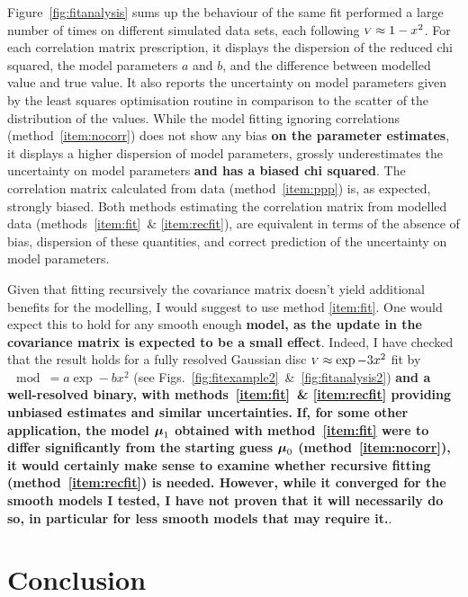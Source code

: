 \documentclass{pasa}
\def\correction#1{{\bfseries #1}}
\begin{document}
Figure~\ref{fig:fitanalysis} sums up the behaviour of the same fit performed a large number of times on different simulated data sets, each following ${\scriptstyle V} \approx 1-x^2$.  For each correlation matrix prescription, it displays the dispersion of the reduced chi squared, the model parameters $a$ and $b$, and the difference between modelled value and true value. It also reports the uncertainty on model parameters given by the least squares optimisation routine in comparison to the scatter of the distribution of the values. While the model fitting ignoring correlations (method~\ref{item:nocorr}) does not show any bias \correction{on the parameter estimates}, it displays a higher dispersion of model parameters,  grossly underestimates the uncertainty on model parameters \correction{and has a biased chi squared}.  The correlation matrix calculated from data (method~\ref{item:ppp}) is, as expected, strongly biased. Both methods estimating the correlation  matrix from modelled data (methods~\ref{item:fit}~\& \ref{item:recfit}), are equivalent in terms of the absence of bias, dispersion of these quantities, and correct prediction of the uncertainty on model parameters.

Given that fitting recursively the covariance matrix doesn't yield additional benefits for the modelling, I would suggest to use method \ref{item:fit}. One would expect this to hold for any smooth enough \textbf{model, as the update in the covariance matrix is expected to be a small effect}. Indeed, I have checked that the result holds for a fully resolved Gaussian disc ${\scriptstyle V} \approx \exp -3x^2$ fit by $\mod = a\exp -bx^2$ (see Figs.~\ref{fig:fitexample2}~\&~\ref{fig:fitanalysis2}) \correction{and a well-resolved binary, with methods~\ref{item:fit}~\& \ref{item:recfit} providing unbiased estimates and similar uncertainties.} \correction{If, for some other application, the model $\boldsymbol{\mu}_1$ obtained with method~\ref{item:fit} were to differ significantly from the starting guess $\boldsymbol{\mu}_0$ (method~\ref{item:nocorr}), it would certainly make sense to examine whether recursive fitting (method~\ref{item:recfit}) is needed. However, while it converged for the smooth models I tested, I have not proven that it will necessarily do so, in particular for less smooth models that may require it.}.



\section{Conclusion}
\label{sec:conclusion}
\end{document}
